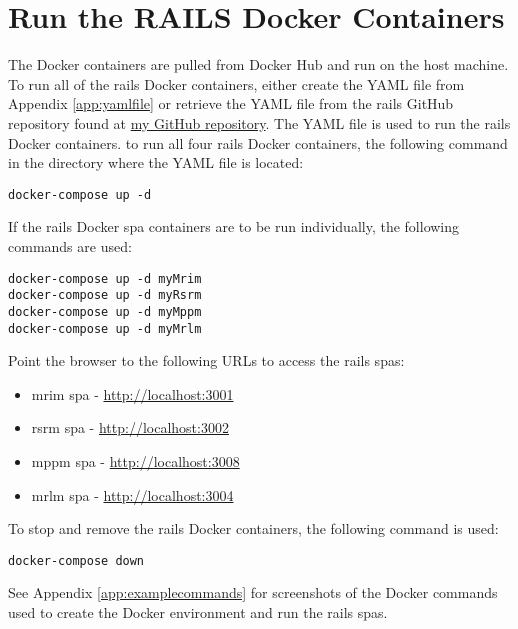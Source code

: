 \section{Run the RAILS Docker Containers}
\label{sec:railsdockercontainers}
The Docker containers are pulled from Docker Hub and run on the host machine. To run all of the \gls{rails} Docker containers, either create the YAML file from Appendix \ref{app:yamlfile} or retrieve the YAML file from the \gls{rails} GitHub repository found at \href{https://github.com/djbristow/RAILS/tree/master/Docker%20Based}{my GitHub repository}. The YAML file is used to run the \gls{rails} Docker containers.  
to run all four \gls{rails} Docker containers, the following command in the directory where the YAML file is located:
\begin{verbatim}
docker-compose up -d
\end{verbatim}
If the \gls{rails} Docker \gls{spa} containers are to be run individually, the following commands are used:
\begin{verbatim}
docker-compose up -d myMrim
docker-compose up -d myRsrm
docker-compose up -d myMppm
docker-compose up -d myMrlm
\end{verbatim}
Point the browser to the following URLs to access the \gls{rails} \glspl{spa}:
\begin{itemize}
    \item \gls{mrim} \gls{spa} - \href{http://localhost:3001}{http://localhost:3001}
    \item \gls{rsrm} \gls{spa} - \href{http://localhost:3002}{http://localhost:3002}
    \item \gls{mppm} \gls{spa} - \href{http://localhost:3008}{http://localhost:3008}
    \item \gls{mrlm} \gls{spa} - \href{http://localhost:3004}{http://localhost:3004}
\end{itemize}
To stop and remove the \gls{rails} Docker containers, the following command is used:
\begin{verbatim}
docker-compose down
\end{verbatim}

See Appendix \ref{app:examplecommands} for screenshots of the Docker commands used to create the Docker environment and run the \gls{rails} \glspl{spa}.